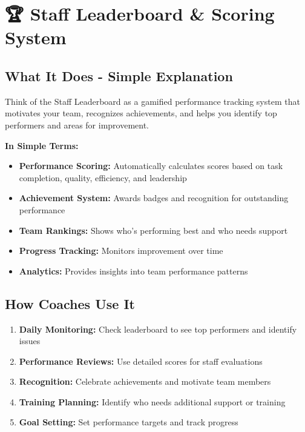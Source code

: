 \documentclass[12pt,a4paper]{article}
\begin{document}
\section{🏆 Staff Leaderboard \& Scoring System}

\subsection{What It Does - Simple Explanation}
Think of the Staff Leaderboard as a gamified performance tracking system that motivates your team, recognizes achievements, and helps you identify top performers and areas for improvement.

\textbf{In Simple Terms:}
\begin{itemize}
    \item \textbf{Performance Scoring:} Automatically calculates scores based on task completion, quality, efficiency, and leadership
    \item \textbf{Achievement System:} Awards badges and recognition for outstanding performance
    \item \textbf{Team Rankings:} Shows who's performing best and who needs support
    \item \textbf{Progress Tracking:} Monitors improvement over time
    \item \textbf{Analytics:} Provides insights into team performance patterns
\end{itemize}

\subsection{How Coaches Use It}
\begin{enumerate}
    \item \textbf{Daily Monitoring:} Check leaderboard to see top performers and identify issues
    \item \textbf{Performance Reviews:} Use detailed scores for staff evaluations
    \item \textbf{Recognition:} Celebrate achievements and motivate team members
    \item \textbf{Training Planning:} Identify who needs additional support or training
    \item \textbf{Goal Setting:} Set performance targets and track progress
\end{enumerate}
\end{document}
